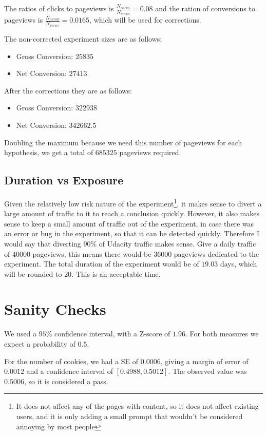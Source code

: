 \documentclass[12pt,a4paper]{article}
\begin{document}
The ratios of clicks to pageviews is $\frac{N_{clicks}}{N_{views}} = 0.08$ and the
ration of conversions to pageviews is $\frac{N_{enroll}}{N_{views}} = 0.0165$,
which will be used for corrections.

The non-corrected experiment sizes are as follows:
\begin{itemize}
\item Gross Conversion: $25835$
\item Net Conversion: $27413$
\end{itemize}

After the corrections they are as follows:
\begin{itemize}
\item Gross Conversion: $322938$
\item Net Conversion: $342662.5$
\end{itemize}

Doubling the maximum because we need this number of pageviews for each
hypothesis, we get a total of $685325$ pageviews required.

\subsection{Duration vs Exposure}
Given the relatively low risk nature of the experiment\footnote{It does not
affect any of the pages with content, so it does not affect existing users, and
it is only adding a small prompt that wouldn't be considered annoying by most
people}, it makes sense to divert a large amount of traffic to it to reach a
conclusion quickly. However, it also makes sense to keep a small amount of
traffic out of the experiment, in case there was an error or bug in the
experiment, so that it can be detected quickly.  Therefore I would say that
diverting $90$\% of Udacity traffic makes sense. Give a daily traffic of $40000$
pageviews, this means there would be $36000$ pageviews dedicated to the
experiment. The total duration of the experiment would be of $19.03$ days, which
will be rounded to $20$. This is an acceptable time.

\section{Sanity Checks}
We used a $95$\% confidence interval, with a Z-score of $1.96$. For both
measures we expect a probability of $0.5$.

For the number of cookies, we had a SE of $0.0006$, giving a margin of error of
$0.0012$ and a confidence interval of $[ 0.4988, 0.5012 ]$. The observed value
was $0.5006$, so it is considered a pass.
\end{document}
